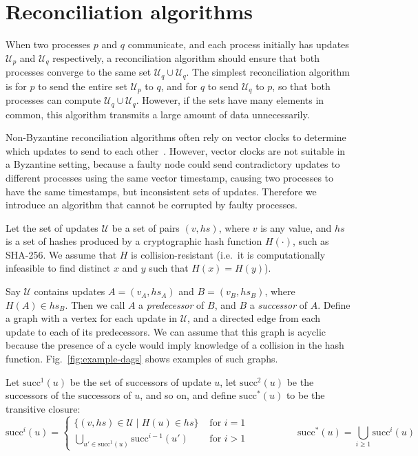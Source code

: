 \documentclass[manuscript,anonymous]{acmart}
\begin{document}
\section{Reconciliation algorithms}\label{sec:algorithm}

When two processes $p$ and $q$ communicate, and each process initially has updates $\mathcal{U}_p$ and $\mathcal{U}_q$ respectively, a reconciliation algorithm should ensure that both processes converge to the same set $\mathcal{U}_q \cup \mathcal{U}_q$.
The simplest reconciliation algorithm is for $p$ to send the entire set $\mathcal{U}_p$ to $q$, and for $q$ to send $\mathcal{U}_q$ to $p$, so that both processes can compute $\mathcal{U}_q \cup \mathcal{U}_q$.
However, if the sets have many elements in common, this algorithm transmits a large amount of data unnecessarily.

Non-Byzantine reconciliation algorithms often rely on vector clocks to determine which updates to send to each other~\cite{Schwarz:1994}.
However, vector clocks are not suitable in a Byzantine setting, because a faulty node could send contradictory updates to different processes using the same vector timestamp, causing two processes to have the same timestamps, but inconsistent sets of updates.
Therefore we introduce an algorithm that cannot be corrupted by faulty processes.

Let the set of updates $\mathcal{U}$ be a set of pairs $(v, \mathit{hs})$, where $v$ is any value, and $\mathit{hs}$ is a set of hashes produced by a cryptographic hash function $H(\cdot)$, such as SHA-256.
We assume that $H$ is collision-resistant (i.e.\ it is computationally infeasible to find distinct $x$ and $y$ such that $H(x) = H(y)$).

Say $\mathcal{U}$ contains updates $A = (v_A, \mathit{hs}_A)$ and $B = (v_B, \mathit{hs}_B)$, where $H(A) \in \mathit{hs}_B$.
Then we call $A$ a \emph{predecessor} of $B$, and $B$ a \emph{successor} of $A$.
Define a graph with a vertex for each update in $\mathcal{U}$, and a directed edge from each update to each of its predecessors.
We can assume that this graph is acyclic because the presence of a cycle would imply knowledge of a collision in the hash function.
Fig.~\ref{fig:example-dags} shows examples of such graphs.

Let $\mathrm{succ}^1(u)$ be the set of successors of update $u$, let $\mathrm{succ}^2(u)$ be the successors of the successors of $u$, and so on, and define $\mathrm{succ}^*(u)$ to be the transitive closure:
\[
\mathrm{succ}^i(u) =
\begin{cases}
\{( v, \mathit{hs}) \in \mathcal{U} \mid H(u) \in \mathit{hs}\} & \text{ for } i=1 \\
\bigcup_{u' \in \mathrm{succ}^1(u)} \mathrm{succ}^{i-1}(u') & \text{ for } i>1
\end{cases}
\hspace{60pt}
\mathrm{succ}^*(u) = \bigcup_{i \ge 1} \mathrm{succ}^i(u)
\]
\end{document}
